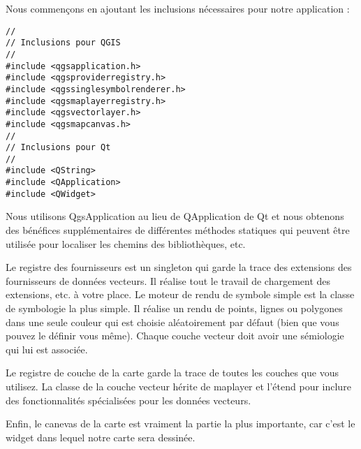 Nous commençons en ajoutant les inclusions nécessaires pour notre application :

\begin{verbatim}
//
// Inclusions pour QGIS
//
#include <qgsapplication.h>
#include <qgsproviderregistry.h>
#include <qgssinglesymbolrenderer.h>
#include <qgsmaplayerregistry.h>
#include <qgsvectorlayer.h>
#include <qgsmapcanvas.h>
//
// Inclusions pour Qt
//
#include <QString>
#include <QApplication>
#include <QWidget>
\end{verbatim}

Nous utilisons QgsApplication au lieu de QApplication de Qt et nous obtenons des
bénéfices supplémentaires de différentes méthodes statiques qui peuvent être
utilisée pour localiser les chemins des bibliothèques, etc.

Le registre des fournisseurs est un singleton qui garde la trace des extensions 
des fournisseurs de données vecteurs. Il réalise tout le travail de chargement 
des extensions, etc. à votre place. Le moteur de rendu de symbole simple est la 
classe de symbologie la plus simple. Il réalise un rendu de points, lignes ou 
polygones dans une seule couleur qui est choisie aléatoirement par défaut (bien 
que vous pouvez le définir vous même). Chaque couche vecteur doit avoir une 
sémiologie qui lui est associée.

Le registre de couche de la carte garde la trace de toutes les couches que vous 
utilisez. La classe de la couche vecteur hérite de maplayer et l'étend pour 
inclure des fonctionnalités spécialisées pour les données vecteurs.

Enfin, le canevas de la carte est vraiment la partie la plus importante, car c'est le widget 
dans lequel notre carte sera dessinée.

